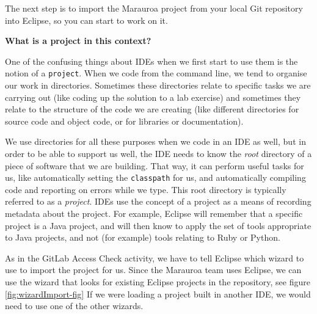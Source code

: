 \documentclass[
]{book}
\begin{document}
The next step is to import the Marauroa project from your local Git repository into Eclipse, so you can start to work on it.

\textbf{What is a project in this context?}

One of the confusing things about IDEs when we first start to use them is the notion of a \texttt{project}. When we code from the command line, we tend to organise our work in directories. Sometimes these directories relate to specific tasks we are carrying out (like coding up the solution to a lab exercise) and sometimes they relate to the structure of the code we are creating (like different directories for source code and object code, or for libraries or documentation).

We use directories for all these purposes when we code in an IDE as well, but in order to be able to support us well, the IDE needs to know the \emph{root} directory of a piece of software that we are building. That way, it can perform useful tasks for us, like automatically setting the \texttt{classpath} for us, and automatically compiling code and reporting on errors while we type. This root directory is typically referred to as a \emph{project}. IDEs use the concept of a project as a means of recording metadata about the project. For example, Eclipse will remember that a specific project is a Java project, and will then know to apply the set of tools appropriate to Java projects, and not (for example) tools relating to Ruby or Python.

As in the GitLab Access Check activity, we have to tell Eclipse which wizard to use to import the project for us. Since the Marauroa team uses Eclipse, we can use the wizard that looks for existing Eclipse projects in the repository, see figure \ref{fig:wizardImport-fig} If we were loading a project built in another IDE, we would need to use one of the other wizards.
\end{document}
